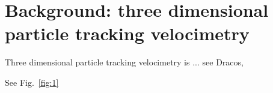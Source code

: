 \section{Background: three dimensional particle tracking velocimetry} 

Three dimensional particle tracking velocimetry is ... see Dracos, \cite{1996}
  
\cite{L_THI_2005} 

See Fig.~\ref{fig:1}
  